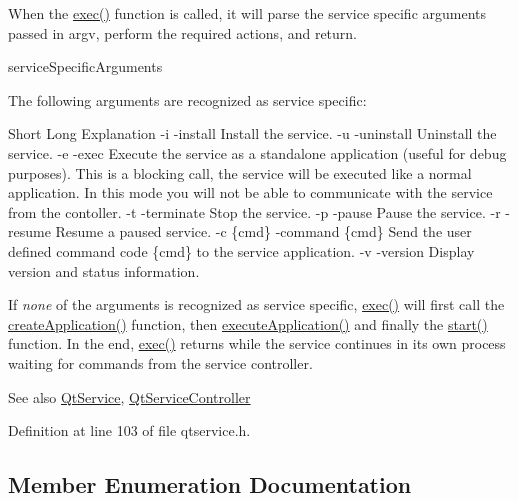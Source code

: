 When the \mbox{\hyperlink{class_qt_service_base_afae2e589de71c1ae3ae8db3dc9ab9c64}{exec()}} function is called, it will parse the service specific arguments passed in {\ttfamily argv}, perform the required actions, and return.

service\+Specific\+Arguments

The following arguments are recognized as service specific\+:

Short  Long  Explanation   -\/i  -\/install  Install the service.   -\/u  -\/uninstall  Uninstall the service.   -\/e  -\/exec  Execute the service as a standalone application (useful for debug purposes). This is a blocking call, the service will be executed like a normal application. In this mode you will not be able to communicate with the service from the contoller.   -\/t  -\/terminate  Stop the service.   -\/p  -\/pause  Pause the service.   -\/r  -\/resume  Resume a paused service.   -\/c {\itshape }\{cmd\}  -\/command {\itshape }\{cmd\}  Send the user defined command code {\itshape }\{cmd\} to the service application.   -\/v  -\/version  Display version and status information. 

If {\itshape none} of the arguments is recognized as service specific, \mbox{\hyperlink{class_qt_service_base_afae2e589de71c1ae3ae8db3dc9ab9c64}{exec()}} will first call the \mbox{\hyperlink{class_qt_service_base_ac5ae73935f489282b35c70b27b341390}{create\+Application()}} function, then \mbox{\hyperlink{class_qt_service_base_ab70633cd29a22758dfa0502b77e564f6}{execute\+Application()}} and finally the \mbox{\hyperlink{class_qt_service_base_adbc0cd621b41bd3a6a1f62fda432e9e4}{start()}} function. In the end, \mbox{\hyperlink{class_qt_service_base_afae2e589de71c1ae3ae8db3dc9ab9c64}{exec()}} returns while the service continues in its own process waiting for commands from the service controller.

\begin{DoxySeeAlso}{See also}
\mbox{\hyperlink{class_qt_service}{Qt\+Service}}, \mbox{\hyperlink{class_qt_service_controller}{Qt\+Service\+Controller}} 
\end{DoxySeeAlso}


Definition at line 103 of file qtservice.\+h.



\subsection{Member Enumeration Documentation}
\mbox{\label{class_qt_service_base_acffd9389fe7178bf1f35d8bf3dae1095}} 

